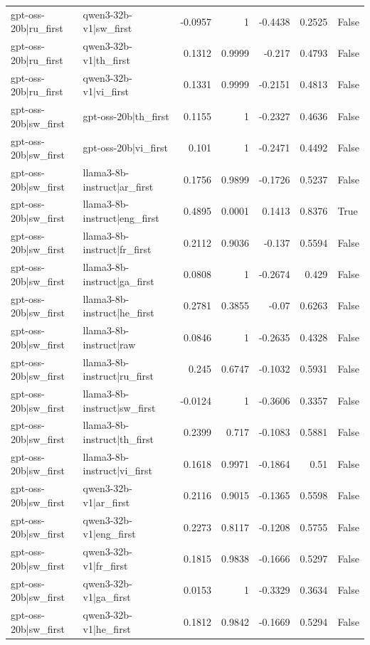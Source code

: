 \begin{table}
\begin{tabular}{l l r r r r l}
gpt-oss-20b|ru_first & qwen3-32b-v1|sw_first & -0.0957 & 1 & -0.4438 & 0.2525 & False \\
gpt-oss-20b|ru_first & qwen3-32b-v1|th_first & 0.1312 & 0.9999 & -0.217 & 0.4793 & False \\
gpt-oss-20b|ru_first & qwen3-32b-v1|vi_first & 0.1331 & 0.9999 & -0.2151 & 0.4813 & False \\
gpt-oss-20b|sw_first & gpt-oss-20b|th_first & 0.1155 & 1 & -0.2327 & 0.4636 & False \\
gpt-oss-20b|sw_first & gpt-oss-20b|vi_first & 0.101 & 1 & -0.2471 & 0.4492 & False \\
gpt-oss-20b|sw_first & llama3-8b-instruct|ar_first & 0.1756 & 0.9899 & -0.1726 & 0.5237 & False \\
gpt-oss-20b|sw_first & llama3-8b-instruct|eng_first & 0.4895 & 0.0001 & 0.1413 & 0.8376 & True \\
gpt-oss-20b|sw_first & llama3-8b-instruct|fr_first & 0.2112 & 0.9036 & -0.137 & 0.5594 & False \\
gpt-oss-20b|sw_first & llama3-8b-instruct|ga_first & 0.0808 & 1 & -0.2674 & 0.429 & False \\
gpt-oss-20b|sw_first & llama3-8b-instruct|he_first & 0.2781 & 0.3855 & -0.07 & 0.6263 & False \\
gpt-oss-20b|sw_first & llama3-8b-instruct|raw & 0.0846 & 1 & -0.2635 & 0.4328 & False \\
gpt-oss-20b|sw_first & llama3-8b-instruct|ru_first & 0.245 & 0.6747 & -0.1032 & 0.5931 & False \\
gpt-oss-20b|sw_first & llama3-8b-instruct|sw_first & -0.0124 & 1 & -0.3606 & 0.3357 & False \\
gpt-oss-20b|sw_first & llama3-8b-instruct|th_first & 0.2399 & 0.717 & -0.1083 & 0.5881 & False \\
gpt-oss-20b|sw_first & llama3-8b-instruct|vi_first & 0.1618 & 0.9971 & -0.1864 & 0.51 & False \\
gpt-oss-20b|sw_first & qwen3-32b-v1|ar_first & 0.2116 & 0.9015 & -0.1365 & 0.5598 & False \\
gpt-oss-20b|sw_first & qwen3-32b-v1|eng_first & 0.2273 & 0.8117 & -0.1208 & 0.5755 & False \\
gpt-oss-20b|sw_first & qwen3-32b-v1|fr_first & 0.1815 & 0.9838 & -0.1666 & 0.5297 & False \\
gpt-oss-20b|sw_first & qwen3-32b-v1|ga_first & 0.0153 & 1 & -0.3329 & 0.3634 & False \\
gpt-oss-20b|sw_first & qwen3-32b-v1|he_first & 0.1812 & 0.9842 & -0.1669 & 0.5294 & False \\

\end{tabular}
\end{table}
